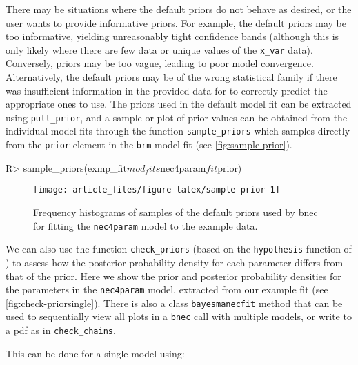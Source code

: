 \documentclass[
]{jss}
\begin{document}
There may be situations where the default  priors do not
behave as desired, or the user wants to provide informative priors. For
example, the default priors may be too informative, yielding
unreasonably tight confidence bands (although this is only likely where
there are few data or unique values of the \texttt{x\_var} data).
Conversely, priors may be too vague, leading to poor model convergence.
Alternatively, the default priors may be of the wrong statistical family
if there was insufficient information in the provided data for
 to correctly predict the appropriate ones to use. The
priors used in the default model fit can be extracted using
\texttt{pull\_prior}, and a sample or plot of prior values can be
obtained from the individual  model fits through the function
\texttt{sample\_priors} which samples directly from the \texttt{prior}
element in the \texttt{brm} model fit (see \autoref{fig:sample-prior}).

\begin{CodeChunk}
\begin{CodeInput}
R> sample_priors(exmp_fit$mod_fits$nec4param$fit$prior)
\end{CodeInput}
\begin{figure}

{\centering \texttt{[image: article\_files/figure-latex/sample-prior-1]} 

}

\caption[Frequency histograms of samples of the default priors used by bnec for fitting the \texttt{nec4param} model to the example data]{Frequency histograms of samples of the default priors used by bnec for fitting the \texttt{nec4param} model to the example data.}\label{fig:sample-prior}
\end{figure}
\end{CodeChunk}

We can also use the function \texttt{check\_priors} (based on the
\texttt{hypothesis} function of ) to assess how the posterior
probability density for each parameter differs from that of the prior.
Here we show the prior and posterior probability densities for the
parameters in the \texttt{nec4param} model, extracted from our example
fit (see \autoref{fig:check-priorsingle}). There is also a class
\texttt{bayesmanecfit} method that can be used to sequentially view all
plots in a \texttt{bnec} call with multiple models, or write to a pdf as
in \texttt{check\_chains}.

This can be done for a single model using:
\end{document}
